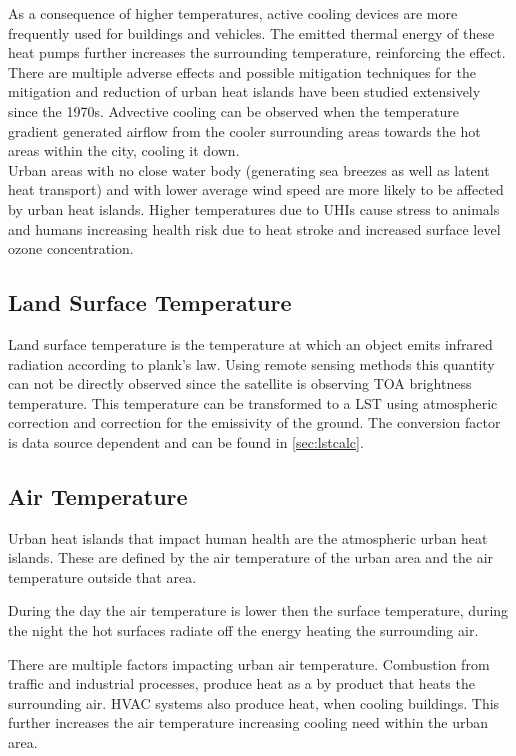 As a consequence of higher temperatures, active cooling devices are more frequently used for buildings and vehicles. 
The emitted thermal energy of these heat pumps further increases the surrounding temperature, reinforcing the effect.
\\
There are multiple adverse effects and possible mitigation techniques for the mitigation and reduction of urban heat islands have been studied extensively since the 1970s\cite{Nichol1994}\cite{Stewart2011}. %
Advective cooling can be observed when the temperature gradient generated airflow from the cooler surrounding areas towards the hot areas within the city, cooling it down\cite{HaegerEugensson1999}. \\
Urban areas with no close water body (generating sea breezes as well as latent heat transport) and with lower average wind speed are more likely to be affected by urban heat islands\cite{Ramamurthy2017}. 
Higher temperatures due to \glspl{UHI} cause stress to animals and humans increasing health risk due to heat stroke and increased surface level ozone concentration\cite{Santamouris2020}.
\subsection{Land Surface Temperature}
Land surface temperature is the temperature at which an object emits infrared radiation according to plank's law\cite{Liang2020}. 
Using remote sensing methods this quantity can not be directly observed since the satellite is observing \gls{TOA} brightness temperature. 
This temperature can be transformed to a \gls{LST} using atmospheric correction and correction for the emissivity of the ground.
The conversion factor is data source dependent and can be found in \cref{sec:lstcalc}.

\subsection{Air Temperature}
Urban heat islands that impact human health are the atmospheric urban heat islands. 
These are defined by the air temperature of the urban area and the air temperature outside that area. %

During the day the air temperature is lower then the surface temperature\cite{epa}, during the night the hot surfaces radiate off the energy heating the surrounding air. 

There are multiple factors impacting urban air temperature. 
Combustion from traffic and industrial processes, produce heat as a by product that heats the surrounding air. 
HVAC systems also produce heat, when cooling buildings. This further increases the air temperature increasing cooling need within the urban area. 


